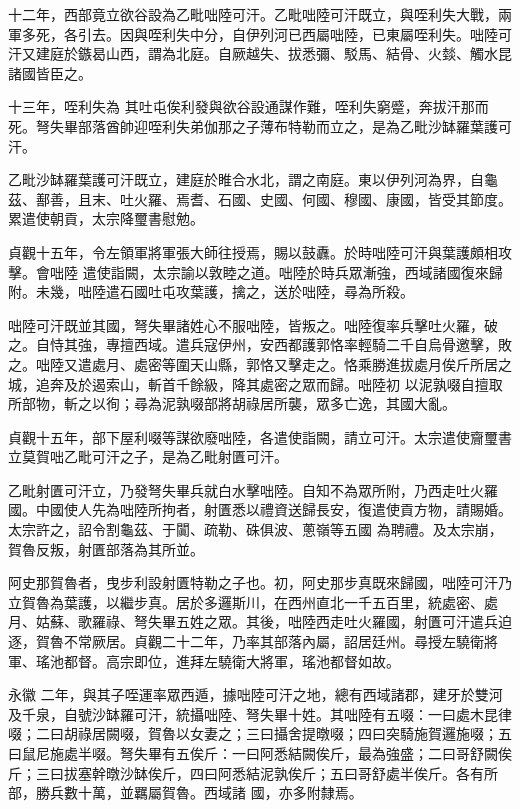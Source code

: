 \begin{pinyinscope}
 十二年，西部竟立欲谷設為乙毗咄陸可汗。乙毗咄陸可汗既立，與咥利失大戰，兩軍多死，各引去。因與咥利失中分，自伊列河已西屬咄陸，已東屬咥利失。咄陸可汗又建庭於鏃曷山西，謂為北庭。自厥越失、拔悉彌、駁馬、結骨、火燅、觸水昆諸國皆臣之。



 十三年，咥利失為
 其吐屯俟利發與欲谷設通謀作難，咥利失窮蹙，奔拔汗那而死。弩失畢部落酋帥迎咥利失弟伽那之子薄布特勒而立之，是為乙毗沙缽羅葉護可汗。



 乙毗沙缽羅葉護可汗既立，建庭於睢合水北，謂之南庭。東以伊列河為界，自龜茲、鄯善，且末、吐火羅、焉耆、石國、史國、何國、穆國、康國，皆受其節度。累遣使朝貢，太宗降璽書慰勉。



 貞觀十五年，令左領軍將軍張大師往授焉，賜以鼓纛。於時咄陸可汗與葉護頗相攻擊。會咄陸
 遣使詣闕，太宗諭以敦睦之道。咄陸於時兵眾漸強，西域諸國復來歸附。未幾，咄陸遣石國吐屯攻葉護，擒之，送於咄陸，尋為所殺。



 咄陸可汗既並其國，弩失畢諸姓心不服咄陸，皆叛之。咄陸復率兵擊吐火羅，破之。自恃其強，專擅西域。遣兵寇伊州，安西都護郭恪率輕騎二千自烏骨邀擊，敗之。咄陸又遣處月、處密等圍天山縣，郭恪又擊走之。恪乘勝進拔處月俟斤所居之城，追奔及於遏索山，斬首千餘級，降其處密之眾而歸。咄陸初
 以泥孰啜自擅取所部物，斬之以徇；尋為泥孰啜部將胡祿居所襲，眾多亡逸，其國大亂。



 貞觀十五年，部下屋利啜等謀欲廢咄陸，各遣使詣闕，請立可汗。太宗遣使齎璽書立莫賀咄乙毗可汗之子，是為乙毗射匱可汗。



 乙毗射匱可汗立，乃發弩失畢兵就白水擊咄陸。自知不為眾所附，乃西走吐火羅國。中國使人先為咄陸所拘者，射匱悉以禮資送歸長安，復遣使貢方物，請賜婚。太宗許之，詔令割龜茲、于闐、疏勒、硃俱波、蔥嶺等五國
 為聘禮。及太宗崩，賀魯反叛，射匱部落為其所並。



 阿史那賀魯者，曳步利設射匱特勒之子也。初，阿史那步真既來歸國，咄陸可汗乃立賀魯為葉護，以繼步真。居於多邏斯川，在西州直北一千五百里，統處密、處月、姑蘇、歌羅祿、弩失畢五姓之眾。其後，咄陸西走吐火羅國，射匱可汗遣兵迫逐，賀魯不常厥居。貞觀二十二年，乃率其部落內屬，詔居廷州。尋授左驍衛將軍、瑤池都督。高宗即位，進拜左驍衛大將軍，瑤池都督如故。



 永徽
 二年，與其子咥運率眾西遁，據咄陸可汗之地，總有西域諸郡，建牙於雙河及千泉，自號沙缽羅可汗，統攝咄陸、弩失畢十姓。其咄陸有五啜：一曰處木昆律啜；二曰胡祿居闕啜，賀魯以女妻之；三曰攝舍提暾啜；四曰突騎施賀邏施啜；五曰鼠尼施處半啜。弩失畢有五俟斤：一曰阿悉結闕俟斤，最為強盛；二曰哥舒闕俟斤；三曰拔塞幹暾沙缽俟斤，四曰阿悉結泥孰俟斤；五曰哥舒處半俟斤。各有所部，勝兵數十萬，並羈屬賀魯。西域諸
 國，亦多附隸焉。




\end{pinyinscope}
